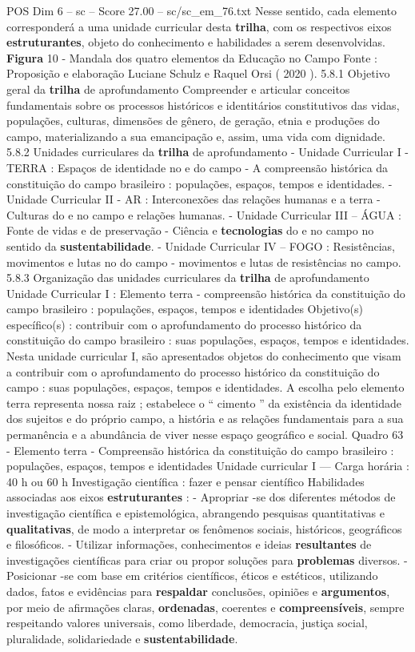 \begin{textsample}{POS Dim 6 – sc – Score 27.00 – sc/sc\_em\_76.txt}
Nesse sentido, cada elemento corresponderá a uma unidade curricular desta \textbf{trilha}, com os respectivos eixos \textbf{estruturantes}, objeto do conhecimento e habilidades a serem desenvolvidas. \textbf{Figura} 10 - Mandala dos quatro elementos da Educação no Campo Fonte : Proposição e elaboração Luciane Schulz e Raquel Orsi ( 2020 ). 5.8.1 Objetivo geral da \textbf{trilha} de aprofundamento Compreender e articular conceitos fundamentais sobre os processos históricos e identitários constitutivos das vidas, populações, culturas, dimensões de gênero, de geração, etnia e produções do campo, materializando a sua emancipação e, assim, uma vida com dignidade. 5.8.2 Unidades curriculares da \textbf{trilha} de aprofundamento - Unidade Curricular I - TERRA : Espaços de identidade no e do campo - A compreensão histórica da constituição do campo brasileiro : populações, espaços, tempos e identidades. - Unidade Curricular II - AR : Interconexões das relações humanas e a terra - Culturas do e no campo e relações humanas. - Unidade Curricular III – ÁGUA : Fonte de vidas e de preservação - Ciência e \textbf{tecnologias} do e no campo no sentido da \textbf{sustentabilidade}. - Unidade Curricular IV – FOGO : Resistências, movimentos e lutas no do campo - movimentos e lutas de resistências no campo. 5.8.3 Organização das unidades curriculares da \textbf{trilha} de aprofundamento Unidade Curricular I : Elemento terra - compreensão histórica da constituição do campo brasileiro : populações, espaços, tempos e identidades Objetivo(s) específico(s) : contribuir com o aprofundamento do processo histórico da constituição do campo brasileiro : suas populações, espaços, tempos e identidades.
Nesta unidade curricular I, são apresentados objetos do conhecimento que visam a contribuir com o aprofundamento do processo histórico da constituição do campo : suas populações, espaços, tempos e identidades.
A escolha pelo elemento terra representa nossa raiz ; estabelece o “ cimento ” da existência da identidade dos sujeitos e do próprio campo, a história e as relações fundamentais para a sua permanência e a abundância de viver nesse espaço geográfico e social.
Quadro 63 - Elemento terra - Compreensão histórica da constituição do campo brasileiro : populações, espaços, tempos e identidades Unidade curricular I — Carga horária : 40 h ou 60 h Investigação científica : fazer e pensar científico Habilidades associadas aos eixos \textbf{estruturantes} : - Apropriar -se dos diferentes métodos de investigação científica e epistemológica, abrangendo pesquisas quantitativas e \textbf{qualitativas}, de modo a interpretar os fenômenos sociais, históricos, geográficos e filosóficos. - Utilizar informações, conhecimentos e ideias \textbf{resultantes} de investigações científicas para criar ou propor soluções para \textbf{problemas} diversos. - Posicionar -se com base em critérios científicos, éticos e estéticos, utilizando dados, fatos e evidências para \textbf{respaldar} conclusões, opiniões e \textbf{argumentos}, por meio de afirmações claras, \textbf{ordenadas}, coerentes e \textbf{compreensíveis}, sempre respeitando valores universais, como liberdade, democracia, justiça social, pluralidade, solidariedade e \textbf{sustentabilidade}.

\end{textsample}
